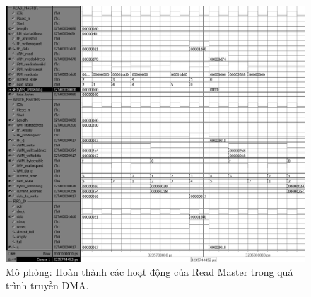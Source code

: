 \begin{figure}[htbp]
    \centering
    \includegraphics[width=\linewidth]{Images/04_05_RM_Done.png}
    \caption{Mô phỏng: Hoàn thành các hoạt động của Read Master trong quá trình truyền DMA.}
    \label{fig:04_05_RM_Done}
\end{figure}

